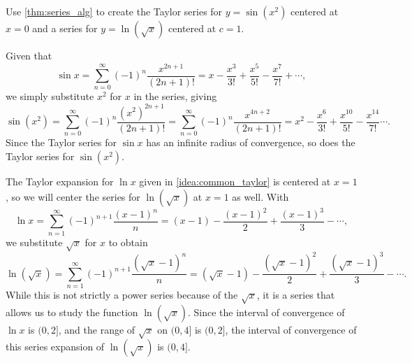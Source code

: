 {Use \autoref{thm:series_alg} to create the Taylor series for $y=\sin(x^2)$ centered at $x=0$ and a series for $y=\ln (\sqrt{x})$ centered at $c=1$.}
{Given that 
\[\sin x = \sum_{n=0}^\infty (-1)^n\frac{x^{2n+1}}{(2n+1)!} = x-\frac{x^3}{3!}+\frac{x^5}{5!} -\frac{x^7}{7!}+\dotsb,\]
we simply substitute $x^2$ for $x$ in the series, giving
\[
\sin (x^2) = \sum_{n=0}^\infty (-1)^n\frac{(x^2)^{2n+1}}{(2n+1)!} = \sum_{n=0}^\infty (-1)^n\frac{x^{4n+2}}{(2n+1)!} = x^2-\frac{x^6}{3!}+\frac{x^{10}}{5!} -\frac{x^{14}}{7!}\dotsb.
\]
Since the Taylor series for $\sin x$ has an infinite radius of convergence, so does the Taylor series for $\sin(x^2)$.\bigskip

The Taylor expansion for $\ln x$ given in \autoref{idea:common_taylor} is centered at $x=1$, so we will center the series for $\ln (\sqrt{x})$ at $x=1$ as well.
With 
\[\ln x = \sum_{n=1}^\infty(-1)^{n+1}\frac{(x-1)^n}{n} = (x-1)- \frac{(x-1)^2}{2} +\frac{(x-1)^3}{3}-\dotsb,\]
we substitute $\sqrt{x}$ for $x$ to obtain
\[\ln (\sqrt{x}) = \sum_{n=1}^\infty(-1)^{n+1}\frac{(\sqrt{x}-1)^n}{n} = (\sqrt{x}-1)- \frac{(\sqrt{x}-1)^2}{2} +\frac{(\sqrt{x}-1)^3}{3}-\dotsb.\]
While this is not strictly a power series because of the $\sqrt x$, it is a series that allows us to study the function $\ln(\sqrt{x})$. Since the interval of convergence of $\ln x$ is $(0,2]$, and the range of $\sqrt{x}$ on $(0,4]$ is $(0,2]$, the interval of convergence of this series expansion of $\ln(\sqrt{x})$ is $(0,4]$.}

